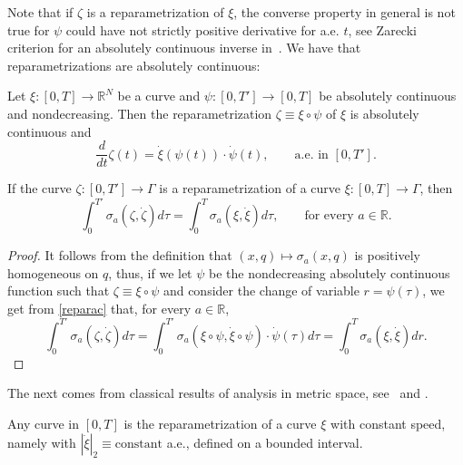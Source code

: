 \documentclass[11pt,a4paper,american]{article}
\newcommand{\Rds}{\mathds R}
\begin{document}
    Note that if $\zeta$ is a reparametrization of $\xi$, the converse property in general is not true for $\psi$ could have not strictly positive derivative for a.e. $t$, see Zarecki criterion for an absolutely continuous inverse in~\cite{Bernal18}. We have that reparametrizations are absolutely continuous:

    \begin{lem}\label{reparac}
        \emph{\cite[Corollary 4]{SerrinVarberg69}} Let $\xi:[0,T]\to\Rds^N$ be a curve and $\psi:[0,T']\to[0,T]$ be absolutely continuous and nondecreasing. Then the reparametrization $\zeta\equiv\xi\circ\psi$ of $\xi$ is absolutely continuous and
        \begin{equation*}
            \frac d{dt}\zeta(t)=\dot\xi(\psi(t))\cdot\dot\psi(t),\qquad\text{a.e.\ in }\left[0,T'\right].
        \end{equation*}
    \end{lem}

    \begin{lem}\label{repsigma}
        If the curve $\zeta:[0,T']\to\Gamma$ is a reparametrization of a curve $\xi:[0,T]\to\Gamma$, then
        \begin{equation*}
            \int_0^{T'}\sigma_a\left(\zeta,\dot\zeta\right)d\tau=\int_0^T\sigma_a\left(\xi,\dot\xi\right)d\tau,\qquad\text{for every }a\in\Rds.
        \end{equation*}
    \end{lem}
    \begin{proof}
        It follows from the definition that $(x,q)\mapsto\sigma_a(x,q)$ is positively homogeneous on $q$, thus, if we let $\psi$ be the nondecreasing absolutely continuous function such that $\zeta\equiv\xi\circ\psi$ and consider the change of variable $r=\psi(\tau)$, we get from \cref{reparac} that, for every $a\in\Rds$,
        \begin{equation*}
            \int_0^{T'}\sigma_a\left(\zeta,\dot\zeta\right)d\tau=\int_0^{T'}\sigma_a\left(\xi\circ\psi,\dot\xi\circ\psi\right)\cdot\dot\psi(\tau)d\tau=\int_0^T\sigma_a\left(\xi,\dot\xi\right)dr.
        \end{equation*}
    \end{proof}

    The next  comes from classical results of analysis in metric space, see~\cite{Bernal18} and \cite[Lemma 3.11]{Davini07}.

    \begin{prop}\label{repconstspeed}
        Any curve in $[0,T]$ is the reparametrization of a curve $\xi$ with constant speed, namely with $|\dot\xi|_2\equiv\mathrm{constant}$ a.e., defined on a bounded interval.
    \end{prop}
\end{document}
